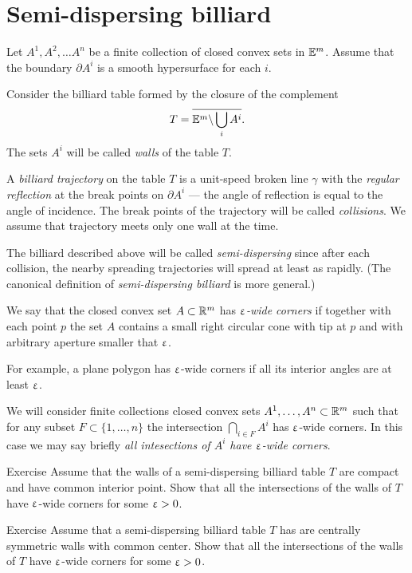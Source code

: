 \section{Semi-dispersing billiard}

Let $A^1,A^2,\dots A^n$ be a finite collection of closed convex sets in $\mathbb{E}^m$.
Assume that the boundary $\partial A^i$ is a smooth hypersurface for each $i$.

Consider the billiard table formed by the closure of the complement 
$$T=\overline{\mathbb{E}^m\backslash \bigcup_{i} A^i}.$$
The sets $A^i$ will be called \emph{walls} of the table $T$.

A \emph{billiard trajectory} 
on the table $T$ is a unit-speed broken line $\gamma$
with the \emph{regular reflection} at the break points on $\partial A^i$ 
--- the angle of reflection is equal to the angle of incidence.
The break points of the trajectory will be called \emph{collisions}.
We assume that trajectory meets only one wall at the time.

The billiard described above will be called \emph{semi-dispersing} since after each collision, the nearby spreading trajectories will spread at least as rapidly.
(The canonical definition of  \emph{semi-dispersing billiard} is more general.)

We say that the closed convex set $A\subset \RR^m$ has  \emph{$\upvarepsilon$-wide corners} 
if together with each point $p$
the set $A$ contains a small right circular cone
with tip at $p$ and
with arbitrary aperture smaller that $\upvarepsilon$.

For example, 
a plane polygon 
has $\upvarepsilon$-wide corners
if all its interior angles are at least $\upvarepsilon$.

We will consider finite collections closed convex sets 
$A^1,\dots,A^n\subset\RR^m$ 
such that for any subset $F\subset\{1,\dots,n\}$
the intersection
$\bigcap_{i\in F}A^i$ 
has $\upvarepsilon$-wide corners.
In this case we may say briefly \emph{all intesections of $A^i$ have $\upvarepsilon$-wide corners}.

\begin{thm}{Exercise}
Assume that the walls
of a semi-dispersing billiard table $T$ 
are compact and have common interior point.
Show that all the intersections of the walls of $T$ have $\upvarepsilon$-wide corners for some $\upvarepsilon>0$.
\end{thm}

\begin{thm}{Exercise}\label{ex:centrally-simmetric-walls}
Assume that a semi-dispersing billiard table $T$ has
are centrally symmetric walls with common center.
Show that all the intersections of the walls of $T$  have $\upvarepsilon$-wide corners for some $\upvarepsilon>0$.
\end{thm}

